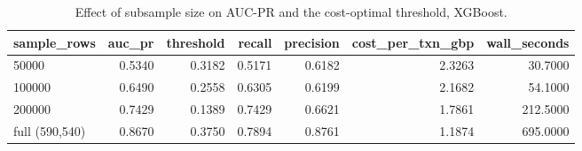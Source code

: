 \begin{table}
\caption{Effect of subsample size on AUC-PR and the cost-optimal threshold, XGBoost.}
\label{tab:table8_sample_size_ablation}
\begin{tabular}{lrrrrrr}
\toprule
sample\_rows & auc\_pr & threshold & recall & precision & cost\_per\_txn\_gbp & wall\_seconds \\
\midrule
50000 & 0.5340 & 0.3182 & 0.5171 & 0.6182 & 2.3263 & 30.7000 \\
100000 & 0.6490 & 0.2558 & 0.6305 & 0.6199 & 2.1682 & 54.1000 \\
200000 & 0.7429 & 0.1389 & 0.7429 & 0.6621 & 1.7861 & 212.5000 \\
full (590,540) & 0.8670 & 0.3750 & 0.7894 & 0.8761 & 1.1874 & 695.0000 \\
\bottomrule
\end{tabular}
\end{table}

